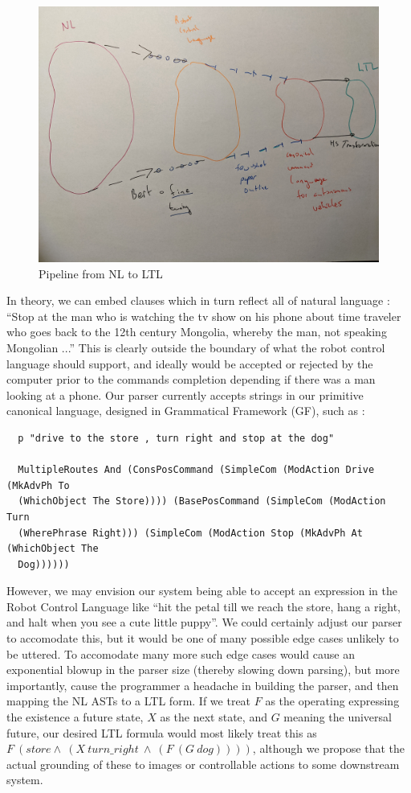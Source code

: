 \documentclass{article}
\begin{document}
\begin{figure}
\centering
\includegraphics[width=150mm]{pics/three.jpg}
\caption{Pipeline from NL to LTL}\label{fig:M3}
\end{figure}

In theory, we can embed clauses which in turn reflect all of natural language :
``Stop at the man who is watching the tv show on his phone about time traveler
who goes back to the 12th century Mongolia, whereby the man, not speaking
Mongolian ...'' This is clearly outside the boundary of what the robot control
language should support, and ideally would be accepted or rejected by the
computer prior to the commands completion depending if there was a man looking
at a phone. Our parser currently accepts strings in our primitive canonical
language, designed in Grammatical Framework (GF), such as :

\begin{verbatim}
  p "drive to the store , turn right and stop at the dog"

  MultipleRoutes And (ConsPosCommand (SimpleCom (ModAction Drive (MkAdvPh To
  (WhichObject The Store)))) (BasePosCommand (SimpleCom (ModAction Turn
  (WherePhrase Right))) (SimpleCom (ModAction Stop (MkAdvPh At (WhichObject The
  Dog))))))
\end{verbatim}

However, we may envision our system being able to accept an expression in the
Robot Control Language like ``hit the petal till we reach the store, hang a
right, and halt when you see a cute little puppy''. We could certainly adjust
our parser to accomodate this, but it would be one of many possible edge cases
unlikely to be uttered. To accomodate many more such edge cases would cause an
exponential blowup in the parser size (thereby slowing down parsing), but more
importantly, cause the programmer a headache in building the parser, and then
mapping the NL ASTs to a LTL form. If we treat $F$ as the operating
expressing the existence a future state, $X$ as the next state, and $G$ meaning
the universal future, our desired LTL formula would most likely treat this as
$F\ (store \land\ (X\ turn\_right\ \land\ (F\ (G\ dog))))$, although we propose
that the actual grounding of these to images or controllable actions to some
downstream system.
\end{document}
